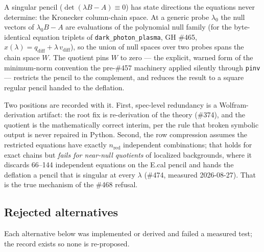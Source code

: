 A singular pencil ($\det(\lambda B - A) \equiv 0$) has state directions
the equations never determine: the Kronecker column-chain space. At a
generic probe $\lambda_0$ the null vectors of $\lambda_0 B - A$ are
evaluations of the polynomial null family (for the byte-identical
equation triplets of \texttt{dark\_photon\_plasma}, GH \#465,
$x(\lambda) = q_\text{diff} + \lambda\, v_\text{diff}$), so the union of
null spaces over two probes spans the chain space $W$. The quotient
pins $W$ to zero --- the explicit, warned form of the minimum-norm
convention the pre-\#457 machinery applied silently through
\texttt{pinv} --- restricts the pencil to the complement, and reduces the
result to a square regular pencil handed to the deflation.

Two positions are recorded with it. First, spec-level redundancy is a
Wolfram-derivation artifact: the root fix is re-derivation of the theory
(\#374), and the quotient is the mathematically correct interim, per the
rule that broken symbolic output is never repaired in Python. Second,
the row compression assumes the restricted equations have exactly
$n_\text{red}$ independent combinations; that holds for exact chains but
\emph{fails for near-null quotients} of localized backgrounds, where it
discards 66--144 independent equations on the E.cal pencil and hands the
deflation a pencil that is singular at every $\lambda$ (\#474, measured
2026-08-27). That is the true mechanism of the \#468 refusal.

\subsection{Rejected alternatives}
\label{sec:pencil-rejected}

Each alternative below was implemented or derived and failed a measured
test; the record exists so none is re-proposed.

